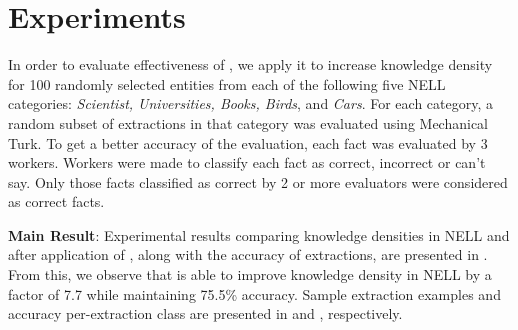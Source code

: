 \section{Experiments}
\label{sec:expts}

In order to evaluate effectiveness of \system{}, we apply it to increase knowledge density for 100 randomly selected entities from each of the following five NELL categories: \textit{Scientist, Universities, Books, Birds}, and \textit{Cars}. For each category, a random subset of extractions in that category was evaluated using Mechanical Turk. To get a better accuracy of the evaluation, each fact was evaluated by 3 workers. Workers were made to classify each fact as correct, incorrect or can't say. 
Only those facts classified as correct by 2 or more evaluators were considered as correct facts.

{\bf Main Result}: Experimental results comparing knowledge densities in NELL and after application of \system{}, along with the accuracy of extractions, are presented in . 
From this, we observe that \system{} is able to improve knowledge density in NELL by a factor of 7.7 while maintaining 75.5\% accuracy.
Sample extraction examples and accuracy per-extraction class are presented in  and , respectively.

